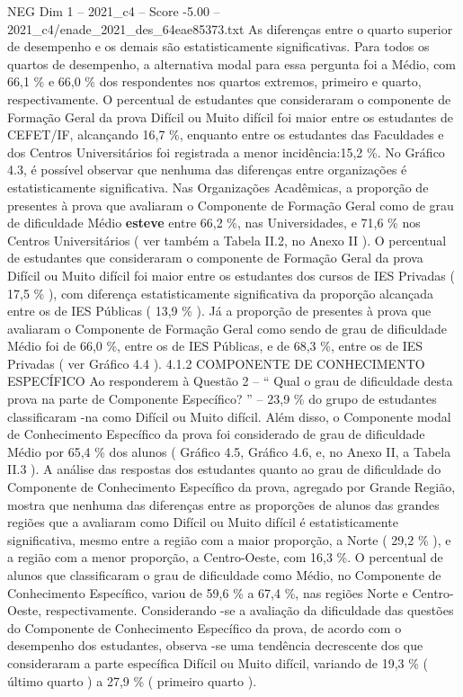 \begin{textsample}{NEG Dim 1 – 2021\_c4 – Score -5.00 – 2021\_c4/enade\_2021\_des\_64eae85373.txt}
As diferenças entre o quarto superior de desempenho e os demais são estatisticamente significativas.
Para todos os quartos de desempenho, a alternativa modal para essa pergunta foi a Médio, com 66,1 \% e 66,0 \% dos respondentes nos quartos extremos, primeiro e quarto, respectivamente.
O percentual de estudantes que consideraram o componente de Formação Geral da prova Difícil ou Muito difícil foi maior entre os estudantes de CEFET/IF, alcançando 16,7 \%, enquanto entre os estudantes das Faculdades e dos Centros Universitários foi registrada a menor incidência:15,2 \%.
No Gráfico 4.3, é possível observar que nenhuma das diferenças entre organizações é estatisticamente significativa.
Nas Organizações Acadêmicas, a proporção de presentes à prova que avaliaram o Componente de Formação Geral como de grau de dificuldade Médio \textbf{esteve} entre 66,2 \%, nas Universidades, e 71,6 \% nos Centros Universitários ( ver também a Tabela II.2, no Anexo II ).
O percentual de estudantes que consideraram o componente de Formação Geral da prova Difícil ou Muito difícil foi maior entre os estudantes dos cursos de IES Privadas ( 17,5 \% ), com diferença estatisticamente significativa da proporção alcançada entre os de IES Públicas ( 13,9 \% ).
Já a proporção de presentes à prova que avaliaram o Componente de Formação Geral como sendo de grau de dificuldade Médio foi de 66,0 \%, entre os de IES Públicas, e de 68,3 \%, entre os de IES Privadas ( ver Gráfico 4.4 ). 4.1.2 COMPONENTE DE CONHECIMENTO ESPECÍFICO Ao responderem à Questão 2 – “ Qual o grau de dificuldade desta prova na parte de Componente Específico? ” – 23,9 \% do grupo de estudantes classificaram -na como Difícil ou Muito difícil.
Além disso, o Componente modal de Conhecimento Específico da prova foi considerado de grau de dificuldade Médio por 65,4 \% dos alunos ( Gráfico 4.5, Gráfico 4.6, e, no Anexo II, a Tabela II.3 ).
A análise das respostas dos estudantes quanto ao grau de dificuldade do Componente de Conhecimento Específico da prova, agregado por Grande Região, mostra que nenhuma das diferenças entre as proporções de alunos das grandes regiões que a avaliaram como Difícil ou Muito difícil é estatisticamente significativa, mesmo entre a região com a maior proporção, a Norte ( 29,2 \% ), e a região com a menor proporção, a Centro-Oeste, com 16,3 \%.
O percentual de alunos que classificaram o grau de dificuldade como Médio, no Componente de Conhecimento Específico, variou de 59,6 \% a 67,4 \%, nas regiões Norte e Centro-Oeste, respectivamente.
Considerando -se a avaliação da dificuldade das questões do Componente de Conhecimento Específico da prova, de acordo com o desempenho dos estudantes, observa -se uma tendência decrescente dos que consideraram a parte específica Difícil ou Muito difícil, variando de 19,3 \% ( último quarto ) a 27,9 \% ( primeiro quarto ).

\end{textsample}
